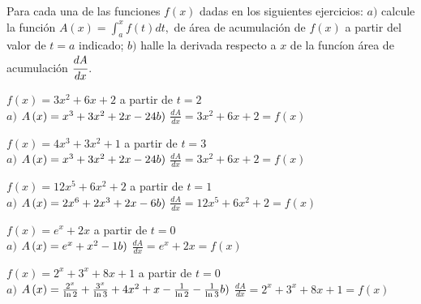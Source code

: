 \textnormal{Para cada una de las funciones \textit{$f\left( x\right) $} dadas en los siguientes ejercicios: \textit{$a)$} calcule la función \textit{$A\left( x\right) =\displaystyle\int_{a}^{x}f\left( t\right)
dt,$} de área de acumulación de \textit{$f\left( x\right) $} a partir del
valor de \textit{$t=a$} indicado; \textit{$b)$} halle la derivada respecto a \textit{$x$} de la funcíon área de acumulación \textit{$\cfrac{dA}{dx}$}.}



\begin{ejer}
{$f\left( x\right) =3x^{2}+6x+2$ a partir de $t=2$} \\
{$a)$ $A\left( x\right) =x^{3}+3x^{2}+2x-24\qquad \\
b)$ $\frac{dA}{dx}
=3x^{2}+6x+2=f\left( x\right)$}
\end{ejer}



\begin{ejer}
{$f\left( x\right) =4x^{3}+3x^{2}+1$ a partir de $t=3$} \\
{$a)$ $A\left( x\right) =x^{3}+3x^{2}+2x-24\qquad \\
b)$ $\frac{dA}{dx} =3x^{2}+6x+2=f\left( x\right)$}
\end{ejer}



\begin{ejer}
{$f\left( x\right) =12x^{5}+6x^{2}+2$ a partir de $t=1$} \\
{$a)$ $A\left( x\right) =2x^{6}+2x^{3}+2x-6\qquad \\ b)$ $ \frac{dA}{dx}=12x^{5}+6x^{2}+2=f\left( x\right)$}
\end{ejer}



\begin{ejer}
{$f\left( x\right) =e^{x}+2x$ a partir de $t=0$} \\
{$a)$ $A\left( x\right) =e^{x}+x^{2}-1\qquad \\ b)$ $\frac{dA}{dx}=e^{x}+2x=f\left( x\right)$}
\end{ejer}



\begin{ejer}
{$f\left( x\right) =2^{x}+3^{x}+8x+1$ a partir de $t=0$} \\
{$a)$ $A\left( x\right) =\frac{2^{x}}{\ln 2}+\frac{3^{x}}{\ln 3}+4x^{2}+x-\frac{1}{\ln 2}-\frac{1}{\ln 3}\qquad \\ 
b)$ $\frac{dA}{dx}
=2^{x}+3^{x}+8x+1=f\left( x\right)$}
\end{ejer}



